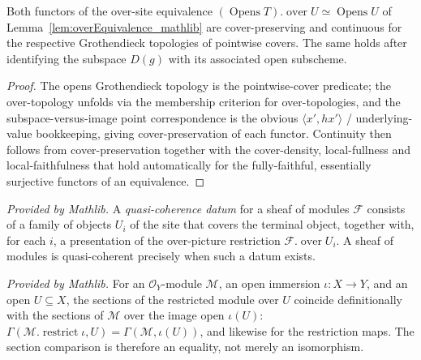 \begin{lemma}
  \label{lem:overEquivalence_isContinuous}
  Both functors of the over-site equivalence
  \((\operatorname{Opens} T).\operatorname{over} U \simeq \operatorname{Opens} U\) of
  Lemma~\ref{lem:overEquivalence_mathlib} are cover-preserving and continuous for the respective
  Grothendieck topologies of pointwise covers. The same holds after identifying the
  subspace \(D(g)\) with its associated open subscheme.
\end{lemma}
\begin{proof}
  The opens Grothendieck topology is the pointwise-cover predicate; the over-topology unfolds via
  the membership criterion for over-topologies, and the subspace-versus-image point correspondence is
  the obvious \(\langle x', hx'\rangle\) / underlying-value bookkeeping, giving cover-preservation of
  each functor. Continuity then follows from cover-preservation together with the cover-density,
  local-fullness and local-faithfulness that hold automatically for the fully-faithful, essentially
  surjective functors of an equivalence.
\end{proof}

\begin{lemma}
  \label{lem:quasicoherentData_mathlib}
  \mathlibok
  \textit{Provided by Mathlib.}
  A \emph{quasi-coherence datum} for a sheaf of modules \(\mathcal{F}\) consists of a family of objects
  \(U_i\) of the site that covers the terminal object, together with, for each \(i\), a presentation of
  the over-picture restriction \(\mathcal{F}.\operatorname{over} U_i\). A sheaf of modules is
  quasi-coherent precisely when such a datum exists.
\end{lemma}

\begin{lemma}
  \label{lem:restrict_obj_mathlib}
  \mathlibok
  \textit{Provided by Mathlib.}
  For an \(\mathcal{O}_Y\)-module \(\mathcal{M}\), an open immersion \(\iota : X \to Y\), and an open
  \(U \subseteq X\), the sections of the restricted module over \(U\) coincide definitionally with the
  sections of \(\mathcal{M}\) over the image open \(\iota(U)\):
  \(\Gamma(\mathcal{M}.\operatorname{restrict} \iota, U) = \Gamma(\mathcal{M}, \iota(U))\), and
  likewise for the restriction maps. The section comparison is therefore an equality, not merely an
  isomorphism.
\end{lemma}

